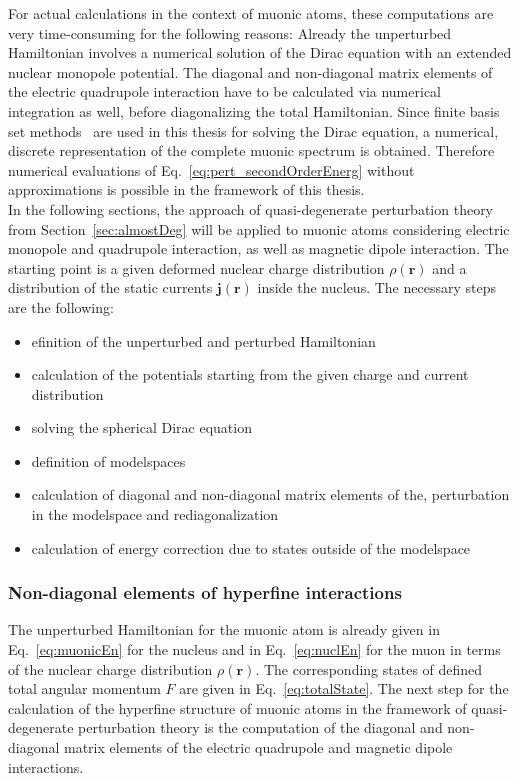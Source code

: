 For actual calculations in the context of muonic atoms, these computations are very time-consuming for the following reasons: Already the unperturbed Hamiltonian involves a numerical solution of the Dirac equation with an extended nuclear monopole potential. The diagonal and non-diagonal matrix elements of the electric quadrupole interaction have to be calculated via numerical integration as well, before diagonalizing the total Hamiltonian. Since finite basis set methods~\cite{Shabaev2004} are used in this thesis for solving the Dirac equation, a numerical, discrete representation of the complete muonic spectrum is obtained. Therefore numerical evaluations of Eq.~\eqref{eq:pert_secondOrderEnerg} without approximations is possible in the framework of this thesis.\\

In the following sections, the approach of quasi-degenerate perturbation theory from Section~\ref{sec:almostDeg} will be applied to muonic atoms considering electric monopole and quadrupole interaction, as well as magnetic dipole interaction. The starting point is a given deformed nuclear charge distribution $\rho(\mathbf{r})$ and a distribution of the static currents $\mathbf{j}(\mathbf{r})$ inside the nucleus.
The necessary steps are the following:
\begin{itemize}
\item efinition of the unperturbed  and perturbed Hamiltonian
\item calculation of the potentials starting from the given charge and current distribution
\item solving the spherical Dirac equation
\item definition of modelspaces
\item calculation of diagonal and non-diagonal matrix elements of the, perturbation in the modelspace and rediagonalization
\item calculation of energy correction due to states outside of the modelspace
\end{itemize}


\subsubsection{Non-diagonal elements of hyperfine interactions}
\label{sec:non-diagElements}
The unperturbed Hamiltonian for the muonic atom is already given in Eq.~\eqref{eq:muonicEn} for the nucleus and in Eq.~\eqref{eq:nuclEn} for the muon in terms of the nuclear charge distribution $\rho(\mathbf{r})$. The corresponding states of defined total angular momentum $F$ are given in Eq.~\eqref{eq:totalState}.
The next step for the calculation of the hyperfine structure of muonic atoms in the framework of quasi-degenerate perturbation theory is the computation of the diagonal and non-diagonal matrix elements of the electric quadrupole and magnetic dipole interactions.

